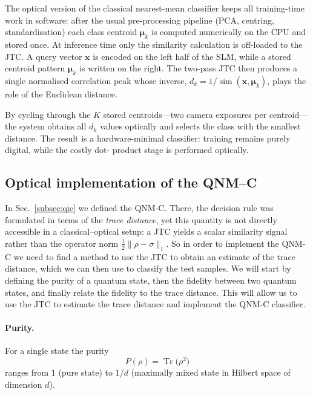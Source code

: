 \documentclass[twocolumn]{article} %
\begin{document}
The optical version of the classical nearest-mean classifier keeps all
training-time work in software: after the usual pre-processing pipeline
(PCA, centring, standardisation) each class centroid
\(\boldsymbol\mu_k\) is computed numerically on the CPU and stored once.
At inference time only the similarity calculation is off-loaded to the JTC.  A query vector \(\mathbf x\) is encoded on
the left half of the SLM, while a stored centroid pattern
\(\boldsymbol\mu_k\) is written on the right.  The two-pass JTC then
produces a single normalised correlation peak whose inverse,
\(d_k = 1/\operatorname{sim}(\mathbf x,\boldsymbol\mu_k)\), plays the
role of the Euclidean distance.

By cycling through the \(K\) stored centroids—two camera exposures per
centroid—the system obtains all \(d_k\) values optically and selects the
class with the smallest distance.  The result is a hardware-minimal
classifier: training remains purely digital, while the costly dot-
product stage is performed optically. 

\subsection{Optical implementation of the QNM–C}
In Sec.~\ref{subsec:qic} we defined the QNM-C. There, the decision rule was formulated in terms of the \emph{trace distance}, yet this quantity is not directly accessible in a classical–optical setup: a JTC yields a scalar similarity signal rather than the operator norm \(\tfrac12\lVert\rho-\sigma\rVert_{1}\). So in order to implement the QNM-C we need to find a method to use the JTC to obtain an estimate of the trace distance, which we can then use to classify the test samples. We will start by defining the purity of a quantum state, then the fidelity between two quantum states, and finally relate the fidelity to the trace distance. This will allow us to use the JTC to estimate the trace distance and implement the QNM-C classifier.

\paragraph{Purity.}
For a single state the purity
\begin{equation}
  P(\rho)=\operatorname{Tr}\!\bigl(\rho^{2}\bigr)
  \label{eq:purity}
\end{equation}
ranges from \(1\) (pure state) to \(1/d\) (maximally mixed state in Hilbert space of dimension \(d\)). 
\end{document}
